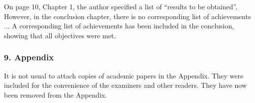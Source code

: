\replyToComment
    {
      On page 10, Chapter 1, the author specified a list of ``results to be obtained''.
      However, in the conclusion chapter, there is no corresponding list of achievements ...
    }
    {
      A corresponding list of achievements has been included in the conclusion, showing that all objectives were met.
    }
    
\subsubsection*{9. Appendix}

\replyToComment
    {It is not usual to attach copies of academic papers in the Appendix.}
    {They were included for the convenience of the examiners and other readers. They have now been removed from the Appendix.}



